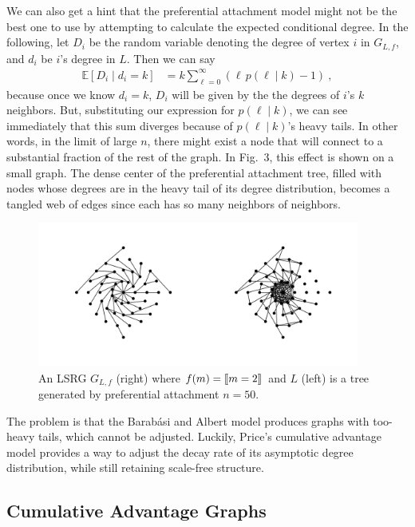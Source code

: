 \documentclass[12pt]{article}
\newcommand{\E}{\mathbb{E}}
\DeclarePairedDelimiter\iverson{\llbracket}{\rrbracket}%
\begin{document}
We can also get a hint that the preferential attachment model
might not be the best one to use by attempting to calculate the
expected conditional degree. In the following, let $D_i$ be the random
variable denoting the degree of vertex $i$ in $G_{L,f}$, and $d_i$
be $i$'s degree in $L$. Then we can say
\begin{align*}
\E[D_i \mid d_i=k] &= k \sum_{\ell=0}^\infty (\ell\,p(\ell\mid k) - 1)\ ,
\end{align*}
because once we know $d_i=k$, $D_i$ will be given by the the degrees
of $i$'s $k$ neighbors. But, substituting our expression for $p(\ell\mid k)$,
we can see immediately that this sum diverges because of $p(\ell\mid k)$'s
heavy tails. In other words, in the limit of large $n$, there might
exist a node that will connect to a substantial fraction of the rest
of the graph. In Fig.\ 3, this effect is shown on a small graph.
The dense center of the preferential attachment tree, filled with nodes
whose degrees are in the heavy tail of its degree distribution, becomes a
tangled web of edges since each has so many neighbors of neighbors.\par

\begin{figure}[t]
\begin{center}
\includegraphics[width=300pt]{3}
\caption{An LSRG $G_{L,f}$ (right) where $f(m)=\iverson{m=2}$ and $L$ (left) is a
tree generated by preferential attachment $n=50$.}
\end{center}
\end{figure}


The problem is that the Barab{\'a}si and Albert model produces graphs with
too-heavy tails, which cannot be adjusted. Luckily, Price's cumulative
advantage model provides a way to adjust the decay rate of its asymptotic
degree distribution, while still retaining scale-free structure.

\subsection{\textbf{\textsf{Cumulative Advantage Graphs}}}
\end{document}
